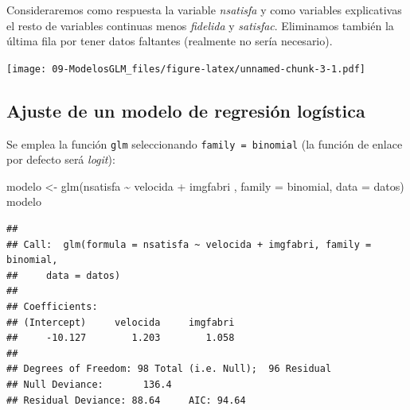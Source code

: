 \documentclass[
]{book}
\newenvironment{Shaded}{\begin{snugshade}}{\end{snugshade}}
\newcommand{\AttributeTok}[1]{\textcolor[rgb]{0.77,0.63,0.00}{#1}}
\newcommand{\DecValTok}[1]{\textcolor[rgb]{0.00,0.00,0.81}{#1}}
\newcommand{\FunctionTok}[1]{\textcolor[rgb]{0.00,0.00,0.00}{#1}}
\newcommand{\NormalTok}[1]{#1}
\newcommand{\OtherTok}[1]{\textcolor[rgb]{0.56,0.35,0.01}{#1}}
\newcommand{\SpecialCharTok}[1]{\textcolor[rgb]{0.00,0.00,0.00}{#1}}
\theoremstyle{break}
\theoremstyle{nonumberplain}
\begin{document}
Consideraremos como respuesta la variable \emph{nsatisfa} y como variables explicativas
el resto de variables continuas menos \emph{fidelida} y \emph{satisfac}.
Eliminamos también la última fila por tener datos faltantes (realmente no sería necesario).

\begin{Shaded}
\end{Shaded}

\texttt{[image: 09-ModelosGLM\_files/figure-latex/unnamed-chunk-3-1.pdf]}

\hypertarget{ajuste-de-un-modelo-de-regresiuxf3n-loguxedstica}{%
\subsection{Ajuste de un modelo de regresión logística}\label{ajuste-de-un-modelo-de-regresiuxf3n-loguxedstica}}

Se emplea la función \texttt{glm} seleccionando \texttt{family\ =\ binomial} (la función de enlace por defecto será \emph{logit}):

\begin{Shaded}
\begin{Highlighting}[]
\NormalTok{modelo }\OtherTok{\textless{}{-}} \FunctionTok{glm}\NormalTok{(nsatisfa }\SpecialCharTok{\textasciitilde{}}\NormalTok{ velocida }\SpecialCharTok{+}\NormalTok{ imgfabri , }\AttributeTok{family =}\NormalTok{ binomial, }\AttributeTok{data =}\NormalTok{ datos)}
\NormalTok{modelo}
\end{Highlighting}
\end{Shaded}

\begin{verbatim}
## 
## Call:  glm(formula = nsatisfa ~ velocida + imgfabri, family = binomial, 
##     data = datos)
## 
## Coefficients:
## (Intercept)     velocida     imgfabri  
##     -10.127        1.203        1.058  
## 
## Degrees of Freedom: 98 Total (i.e. Null);  96 Residual
## Null Deviance:       136.4 
## Residual Deviance: 88.64     AIC: 94.64
\end{verbatim}
\end{document}
